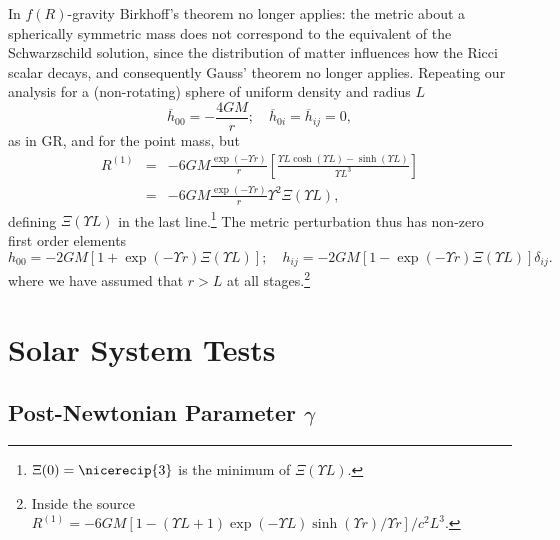 \documentclass[aps,prd,reprint,showpacs]{revtex4-1}
\begin{document}
In $f(R)$-gravity Birkhoff's theorem no longer applies: the metric about a spherically symmetric mass does not correspond to the equivalent of the Schwarzschild solution, since the distribution of matter influences how the Ricci scalar decays, and consequently Gauss' theorem no longer applies. Repeating our analysis for a (non-rotating) sphere of uniform density and radius $L$
\begin{equation}
\overline{h}_{00} = -\frac{4GM}{r}; \quad \overline{h}_{0i} = \overline{h}_{ij} = 0,
\end{equation}
as in GR, and for the point mass, but
\begin{eqnarray}
R^{(1)} & = & -6 G M \frac{\exp(- \Upsilon r)}{r}\left[\frac{\Upsilon L\cosh(\Upsilon L) - \sinh(\Upsilon L)}{\Upsilon L^3}\right] \\
 & = &  -6 G M \frac{\exp(- \Upsilon r)}{r}\Upsilon^2\Xi(\Upsilon L),
\end{eqnarray}
defining $\Xi(\Upsilon L)$ in the last line.\footnote{$\Xi(0) = \nicerecip{3}$ is the minimum of $\Xi(\Upsilon L)$.} The metric perturbation thus has non-zero first order elements\cite{Stelle1978, Capozziello2009b}
\begin{equation}
h_{00} = -2 G M \left[1 + \exp(- \Upsilon r)\Xi(\Upsilon L)\right]; \quad h_{ij} = -2 G M \left[1 - \exp(- \Upsilon r)\Xi(\Upsilon L)\right]\delta_{ij}.
\label{eq:Uniform}
\end{equation}
where we have assumed that $r > L$ at all stages.\footnote{Inside the source $R^{(1)} = -{6 G M}\left[1 - (\Upsilon L + 1)\exp(-\Upsilon L)\sinh(\Upsilon r)/\Upsilon r\right]/{c^2L^3}$.}

\section{Solar System Tests}

\subsection{Post-Newtonian Parameter $\gamma$}
\end{document}
